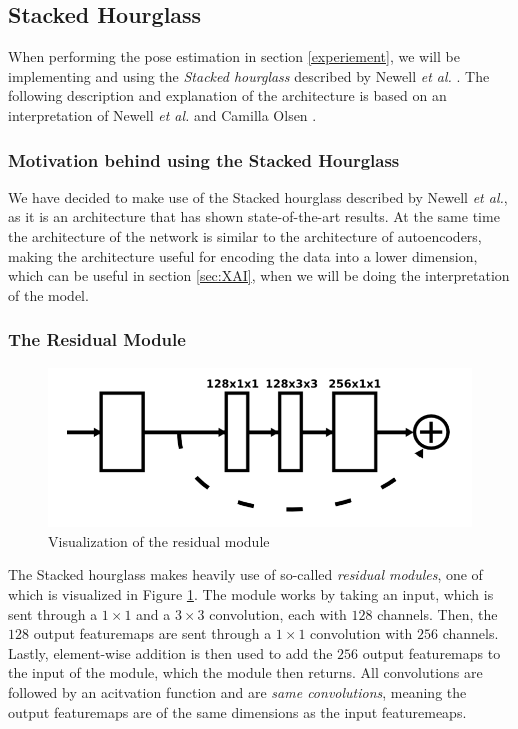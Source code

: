 \documentclass[./main.tex]{subfiles}
\begin{document}
\subsection{Stacked Hourglass}\label{subsec:SHG}
When performing the pose estimation in section \ref{experiement}, we will be implementing and using the \textit{Stacked hourglass} described by Newell \textit{et al.} \cite{Newell}. The following description and explanation of the architecture is based on an interpretation of Newell \textit{et al.} \cite{Newell} and Camilla Olsen \cite{Camilla}.

\subsubsection{Motivation behind using the Stacked Hourglass}\label{subsec:reasoning}
We have decided to make use of the Stacked hourglass described by Newell \textit{et al.}, as it is an architecture that has shown state-of-the-art results. At the same time the architecture of the network is similar to the architecture of autoencoders, making the architecture useful for encoding the data into a lower dimension, which can be useful in section \ref{sec:XAI}, when we will be doing the interpretation of the model.

\subsubsection{The Residual Module}
\begin{figure}[htbp]
    \centering
    \includegraphics[height = 2 cm]{entities/Residual.png}
    \caption{Visualization of the residual module \cite{Newell}}
    \label{fig:residual}
\end{figure}
\noindent The Stacked hourglass makes heavily use of so-called \textit{residual modules}, one of which is visualized in Figure \ref{fig:residual}. The module works by taking an input, which is sent through a $1 \times 1$ and a $3 \times 3$ convolution, each with $128$ channels. Then, the $128$ output featuremaps are sent through a $1 \times 1$ convolution with $256$ channels. Lastly, element-wise addition is then used to add the $256$ output featuremaps to the input of the module, which the module then returns. All convolutions are followed by an acitvation function and are \textit{same convolutions}, meaning the output featuremaps are of the same dimensions as the input featuremeaps.
\end{document}
